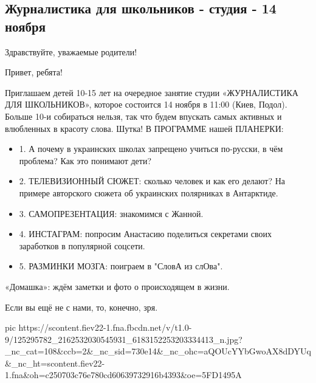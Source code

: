  
 
 

\subsection{Журналистика для школьников - студия - 14 ноября}
\label{sec:12_11_2020.fb.roman_barashev.2.zhurnalistika_dlja_scholnikov}

Здравствуйте, уважаемые родители!

Привет, ребята!

Приглашаем детей 10-15 лет на очередное занятие студии «ЖУРНАЛИСТИКА ДЛЯ
ШКОЛЬНИКОВ», которое состоится 14 ноября в 11:00 (Киев, Подол). Больше 10-и
собираться нельзя, так что будем впускать самых активных и влюбленных в красоту
слова.  Шутка!  В ПРОГРАММЕ нашей ПЛАНЕРКИ:

\begin{itemize}
  \item 1. А почему в украинских школах запрещено учиться по-русски, в чём проблема? Как это понимают дети?
  \item 2. ТЕЛЕВИЗИОННЫЙ СЮЖЕТ: сколько человек и как его делают? На примере авторского сюжета об украинских полярниках в Антарктиде.
  \item 3. САМОПРЕЗЕНТАЦИЯ: знакомимся с Жанной.
  \item 4. ИНСТАГРАМ: попросим Анастасию поделиться секретами своих заработков в популярной соцсети.
  \item 5. РАЗМИНКИ МОЗГА: поиграем в "СловА из слОва".
\end{itemize}

«Домашка»: ждём заметки и фото о происходящем в жизни.  

Если вы ещё не с нами, то, конечно, зря.

\ifcmt
pic https://scontent.fiev22-1.fna.fbcdn.net/v/t1.0-9/125295782_2162532030545931_6183152253203334413_n.jpg?_nc_cat=108&ccb=2&_nc_sid=730e14&_nc_ohc=aQOUcYYbGwoAX8dDYUq&_nc_ht=scontent.fiev22-1.fna&oh=c250703c76e780cd60639732916b4393&oe=5FD1495A

